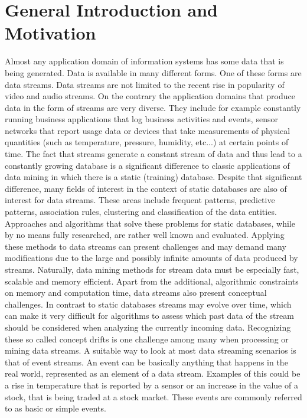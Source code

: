 \section{General Introduction and Motivation}
Almost any application domain of information systems has some data that is being generated. Data is available in many different forms. One of these forms are data streams. Data streams are not limited to the recent rise in popularity of video and audio streams. On the contrary the application domains that produce data in the form of streams are very diverse. They include for example constantly running business applications that log business activities and events, sensor networks that report usage data or devices that take measurements of physical quantities (such as temperature, pressure, humidity, etc...) at certain points of time. \newline
The fact that streams generate a constant stream of data and thus lead to a constantly growing database is a significant difference to classic applications of data mining in which there is a static (training) database. Despite that significant difference, many fields of interest in the context of static databases are also of interest for data streams. These areas include frequent patterns, predictive patterns, association rules, clustering and classification of the data entities. Approaches and algorithms that solve these problems for static databases, while by no means fully researched, are rather well known and evaluated. Applying these methods to data streams can present challenges and may demand many modifications due to the large and possibly infinite amounts of data produced by streams. Naturally, data mining methods for stream data must be especially fast, scalable and memory efficient. \newline
Apart from the additional, algorithmic constraints on memory and computation time, data streams also present conceptual challenges. In contrast to static databases streams may evolve over time, which can make it very difficult for algorithms to assess which past data of the stream should be considered when analyzing the currently incoming data. Recognizing these so called concept drifts is one challenge among many when processing or mining data streams. \newline
A suitable way to look at most data streaming scenarios is that of event streams. An event can be basically anything that happens in the real world, represented as an element of a data stream. Examples of this could be a rise in temperature that is reported by a sensor or an increase in the value of a stock, that is being traded at a stock market. These events are commonly referred to as basic or simple events. \newline
